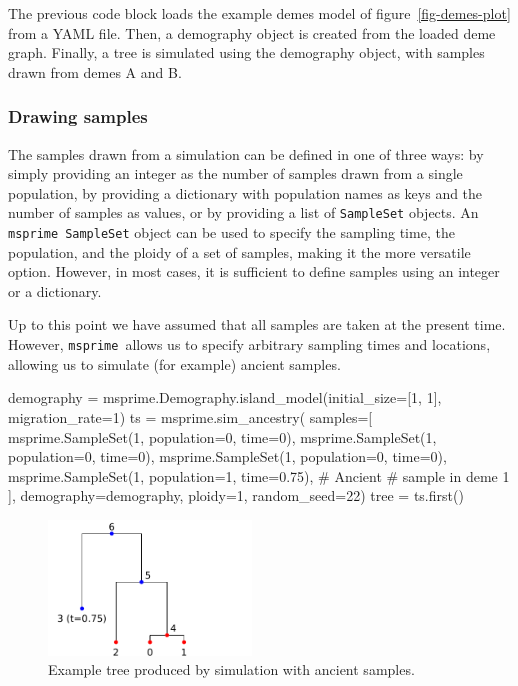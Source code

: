 \documentclass[graybox]{svmult}
\newcommand{\msprime}[0]{\texttt{msprime}}
\begin{document}
The previous code block loads the example demes model of figure~\ref{fig-demes-plot} from a YAML file. Then, a demography
object is created from the loaded deme graph. Finally, a tree is simulated using the demography object, with samples
drawn from demes A and B.


\subsubsection{Drawing samples}\label{ancient-samples}

The samples drawn from a simulation can be defined in one of three ways: by
simply providing an integer as the number of samples drawn from a single population,
by providing a dictionary with population names as keys and the number of
samples as values, or by providing a list of \texttt{SampleSet} objects.
An \msprime\ \texttt{SampleSet} object can be used to specify the sampling
time, the population, and the ploidy of a set of samples, making it the more
versatile option. However, in most cases, it is sufficient to define samples
using an integer or a dictionary.

Up to this point we have assumed that all samples are taken at the
present time. However, \msprime\ allows us to specify arbitrary sampling
times and locations, allowing us to simulate (for example) ancient
samples.

\begin{pythoncode}
demography = msprime.Demography.island_model(initial_size=[1, 1],
                                             migration_rate=1)
ts = msprime.sim_ancestry(
    samples=[
        msprime.SampleSet(1, population=0, time=0),
        msprime.SampleSet(1, population=0, time=0),
        msprime.SampleSet(1, population=0, time=0),
        msprime.SampleSet(1, population=1, time=0.75), # Ancient
        # sample in deme 1
    ],
    demography=demography,
    ploidy=1,
    random_seed=22)
tree = ts.first()
\end{pythoncode}

\begin{figure}[t]
\centering
\includegraphics[width=0.48\textwidth]{images/plot_9.pdf}
\caption{\label{fig-tree-ancient-samples} Example tree produced by simulation
with ancient samples.}
\end{figure}
\end{document}
